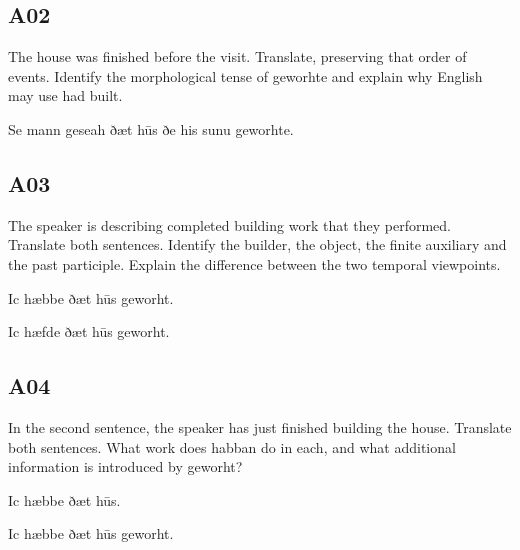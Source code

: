 \subsection*{A02}

\par\begin{minipage}{\linewidth}\raggedright
The house was finished before the visit. Translate, preserving that order of events. Identify the morphological tense of geworhte and explain why English may use had built.

Se mann geseah ðæt hūs ðe his sunu geworhte.

\end{minipage}\par\addvspace{4pt}

\subsection*{A03}

\par\begin{minipage}{\linewidth}\raggedright
The speaker is describing completed building work that they performed. Translate both sentences. Identify the builder, the object, the finite auxiliary and the past participle. Explain the difference between the two temporal viewpoints.

Ic hæbbe ðæt hūs geworht.

Ic hæfde ðæt hūs geworht.

\end{minipage}\par\addvspace{4pt}

\subsection*{A04}

\par\begin{minipage}{\linewidth}\raggedright
In the second sentence, the speaker has just finished building the house. Translate both sentences. What work does habban do in each, and what additional information is introduced by geworht?

Ic hæbbe ðæt hūs.

Ic hæbbe ðæt hūs geworht.

\end{minipage}\par\addvspace{4pt}

